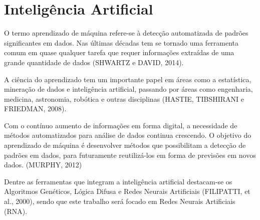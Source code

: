 \section{Inteligência Artificial}

O termo aprendizado de máquina refere-se à detecção automatizada de padrões significantes em dados. Nas últimas décadas tem se tornado uma ferramenta comum em quase qualquer tarefa que requer informações extraídas de uma grande quantidade de dados (SHWARTZ e DAVID, 2014).

A ciência do aprendizado tem um importante papel em áreas como a estatística, mineração de dados e inteligência artificial, passando por áreas como engenharia, medicina, astronomia, robótica e outras disciplinas (HASTIE, TIBSHIRANI e FRIEDMAN, 2008).

Com o contínuo aumento de informações em forma digital, a necessidade de métodos automatizados para análise de dados continua crescendo. O objetivo do aprendizado de máquina é desenvolver métodos que possibilitam a detecção de padrões em dados, para futuramente reutilizá-los em forma de previsões em novos dados. (MURPHY, 2012)

Dentre as ferramentas que integram a inteligência artificial destacam-se os Algoritmos Genéticos, Lógica Difusa e Redes Neurais Artificiais (FILIPATTI, et al., 2000), sendo que este trabalho será focado em Redes Neurais Artificiais (RNA).